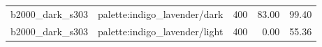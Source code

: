 \begin{longtable}{l>{\raggedright\arraybackslash}p{.42\linewidth}rrr}
b2000\_\allowbreak{}dark\_\allowbreak{}s303 & %
palette:indigo\_\allowbreak{}lavender/dark & %
400 & %
83.00 & %
99.40 \\ %

b2000\_\allowbreak{}dark\_\allowbreak{}s303 & %
palette:indigo\_\allowbreak{}lavender/light & %
400 & %
0.00 & %
55.36 \\ %


\end{longtable}
